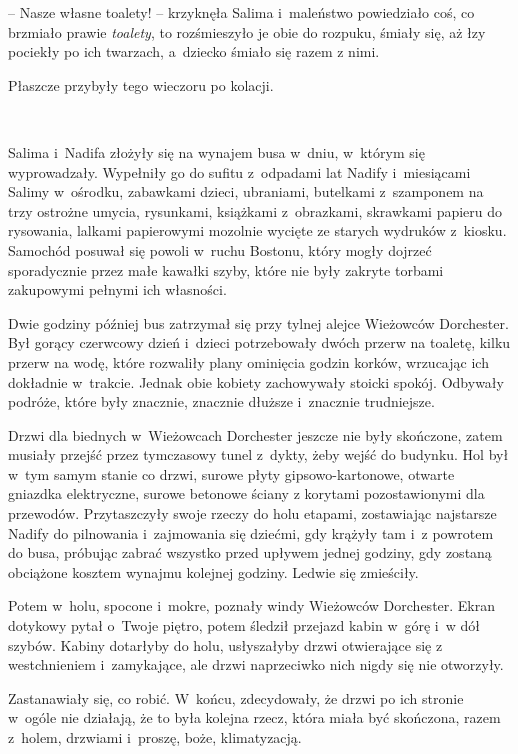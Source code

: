 \documentclass[oneside,polish,11pt,sfheadings]{mwbk}
\begin{document}
-- Nasze własne toalety! -- krzyknęła Salima i~maleństwo powiedziało coś,
co brzmiało prawie \textit{toalety}, to rozśmieszyło je obie do rozpuku,
śmiały się, aż łzy pociekły po ich twarzach, a~dziecko śmiało się razem
z nimi.

Płaszcze przybyły tego wieczoru po kolacji.

~

Salima i~Nadifa złożyły się na wynajem busa w~dniu, w~którym się
wyprowadzały. Wypełniły go do sufitu z~odpadami lat Nadify i~miesiącami
Salimy w~ośrodku, zabawkami dzieci, ubraniami, butelkami z~szamponem na
trzy ostrożne umycia, rysunkami, książkami z~obrazkami, skrawkami
papieru do rysowania, lalkami papierowymi mozolnie wycięte ze starych
wydruków z~kiosku. Samochód posuwał się powoli w~ruchu Bostonu, który
mogły dojrzeć sporadycznie przez małe kawałki szyby, które nie były
zakryte torbami zakupowymi pełnymi ich własności.

Dwie godziny później bus zatrzymał się przy tylnej alejce Wieżowców
Dorchester. Był gorący czerwcowy dzień i~dzieci potrzebowały dwóch
przerw na toaletę, kilku przerw na wodę, które rozwaliły plany ominięcia
godzin korków, wrzucając ich dokładnie w~trakcie. Jednak obie kobiety
zachowywały stoicki spokój. Odbywały podróże, które były znacznie,
znacznie dłuższe i~znacznie trudniejsze.

Drzwi dla biednych w~Wieżowcach Dorchester jeszcze nie były skończone,
zatem musiały przejść przez tymczasowy tunel z~dykty, żeby wejść do
budynku. Hol był w~tym samym stanie co drzwi, surowe płyty
gipsowo-kartonowe, otwarte gniazdka elektryczne, surowe betonowe ściany
z korytami pozostawionymi dla przewodów. Przytaszczyły swoje rzeczy do
holu etapami, zostawiając najstarsze Nadify do pilnowania i~zajmowania
się dziećmi, gdy krążyły tam i~z powrotem do busa, próbując zabrać
wszystko przed upływem jednej godziny, gdy zostaną obciążone kosztem
wynajmu kolejnej godziny. Ledwie się zmieściły.

Potem w~holu, spocone i~mokre, poznały windy Wieżowców Dorchester. Ekran
dotykowy pytał o~Twoje piętro, potem śledził przejazd kabin w~górę i~w dół szybów. Kabiny dotarłyby do holu, usłyszałyby drzwi otwierające się
z westchnieniem i~zamykające, ale drzwi naprzeciwko nich nigdy się nie
otworzyły.

Zastanawiały się, co robić. W~końcu, zdecydowały, że drzwi po ich
stronie w~ogóle nie działają, że to była kolejna rzecz, która miała być
skończona, razem z~holem, drzwiami i~proszę, boże, klimatyzacją.
\end{document}
